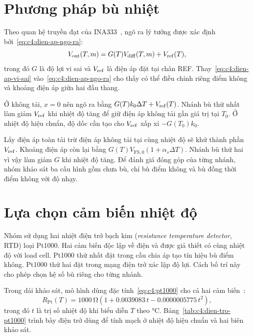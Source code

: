 
\section{Phương pháp bù nhiệt}
\label{sec:c4:phuong-phap}

Theo quan hệ truyền đạt của INA333~\cite{c4_ina333}, ngõ ra lý tưởng
được xác định bởi~\eqref{eq:c4:dien-ap-ngo-ra}:
\begin{equation}
    V_{\mathrm{out}}(T,m)=G(T)V_{\mathrm{diff}}(T,m)+V_{\mathrm{ref}}(T),
    \label{eq:c4:dien-ap-ngo-ra}
\end{equation}
trong đó $G$ là độ lợi vi sai và $V_{\mathrm{ref}}$ là điện áp đặt tại chân REF.
Thay~\eqref{eq:c4:dien-ap-vi-sai} vào~\eqref{eq:c4:dien-ap-ngo-ra}
cho thấy có thể điều chỉnh riêng điểm không và khoảng điện áp giữa
hai đầu thang.

Ở không tải, $x=0$ nên ngõ ra bằng $G(T)k_0\Delta T+V_{\mathrm{ref}}(T)$.
Nhánh bù thứ nhất làm giảm $V_{\mathrm{ref}}$ khi nhiệt độ tăng để giữ điện áp
không tải gần giá trị tại $T_0$. Ở nhiệt độ hiệu chuẩn, độ dốc cần tạo
cho $V_{\mathrm{ref}}$ xấp xỉ $-G(T_0)k_0$.

Lấy điện áp toàn tải trừ điện áp không tải tại cùng nhiệt độ sẽ khử
thành phần $V_{\mathrm{ref}}$. Khoảng điện áp còn lại bằng
$G(T)V_{\mathrm{FS},0}(1+\alpha_s\Delta T)$. Nhánh bù thứ hai vì vậy
làm giảm $G$ khi nhiệt độ tăng. Để đánh giá đóng góp của từng nhánh,
nhóm khảo sát ba cấu hình gồm chưa bù, chỉ bù điểm không và bù đồng
thời điểm không với độ nhạy.

\section{Lựa chọn cảm biến nhiệt độ}
\label{sec:c4:cam-bien}

Nhóm sử dụng hai nhiệt điện trở bạch kim
(\textit{resistance temperature detector}, RTD) loại Pt1000. Hai cảm biến
độc lập về điện và được giả thiết có cùng nhiệt độ với load cell.
Pt1000 thứ nhất đặt trong cầu chia áp tạo tín hiệu bù điểm không.
Pt1000 thứ hai đặt trong mạng điện trở xác lập độ lợi. Cách bố trí này
cho phép chọn hệ số bù riêng cho từng nhánh.

Trong dải khảo sát, mô hình dùng đặc tính~\eqref{eq:c4:pt1000}
cho cả hai cảm biến~\cite{c4_mo_hinh}:
\begin{equation}
    R_{\mathrm{Pt}}(T)
    =\qty{1000}{\ohm}
     \left(1+0.0039083\,t-0.0000005775\,t^2\right),
    \label{eq:c4:pt1000}
\end{equation}
trong đó $t$ là trị số nhiệt độ khi biểu diễn $T$ theo
\unit{\celsius}. Bảng~\ref{tab:c4:dien-tro-pt1000} trình bày điện trở
dùng để tính mạch ở nhiệt độ hiệu chuẩn và hai biên khảo sát.

